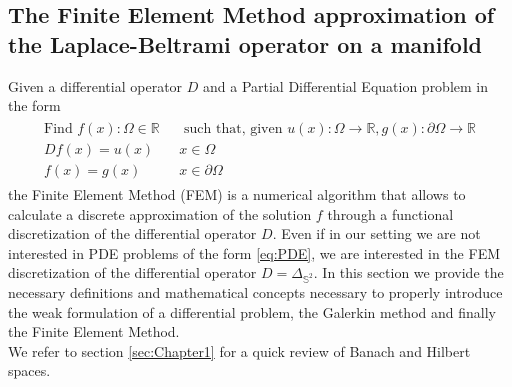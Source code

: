 \subsection{The Finite Element Method approximation of the Laplace-Beltrami operator on a manifold}\label{sec:Chapter3: Using the Finite Element Method to approximate the Laplace-Beltrami operator on a manifold}
Given a differential operator $D$ and a Partial Differential Equation problem in the form
\begin{align}\label{eq:PDE}
\begin{split}
\text{Find } f(x):\Omega\in\mathbb R &\text{ such that, given }u(x):\Omega\to\mathbb R, g(x):\partial\Omega\to\mathbb R\\
Df(x)=u(x)\quad&x\in\Omega\\
f(x)=g(x)\quad &x\in\partial\Omega
\end{split}
\end{align}
the Finite Element Method (FEM) is a numerical algorithm that allows to calculate a discrete approximation of the solution $f$ through a functional discretization of the differential operator $D$. Even if in our setting we are not interested in PDE problems of the form \ref{eq:PDE}, we are interested in the FEM discretization of the differential operator $D=\Delta_{\mathbb S^2}$. In this section we provide the necessary definitions and mathematical concepts necessary to properly introduce the weak formulation of a differential problem, the Galerkin method and finally the Finite Element Method.\\

We refer to section \ref{sec:Chapter1} for a quick review of Banach and Hilbert spaces.
